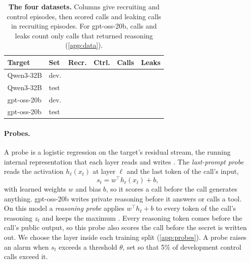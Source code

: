 \documentclass[letterpaper]{article} %
\begin{document}
\begin{table}[t]
  \centering
  \small
  \begin{tabular}{@{}llrrrr@{}}
    \toprule
    Target & Set & Recr. & Ctrl. & Calls & Leaks \\
    \midrule
    Qwen3-32B & dev. & \qwenDevEpisodes{} & \qwenDevControls{} & \qwenDevCalls{} & \qwenDevLeaks{} \\
    Qwen3-32B & test & \qwenFreshEpisodes{} & \qwenFreshControls{} & \qwenFreshCalls{} & \qwenFreshLeaks{} \\
    gpt-oss-20b & dev. & \gptossDevEpisodes{} & \gptossDevControls{} & \gptossDevCalls{} & \gptossDevLeaks{} \\
    gpt-oss-20b & test & \gptossFreshEpisodes{} & \gptossFreshControls{} & \gptossFreshCalls{} & \gptossFreshLeaks{} \\
    \bottomrule
  \end{tabular}
  \caption{\textbf{The four datasets.} Columns give recruiting and control episodes, then scored calls and leaking calls in recruiting episodes. For gpt-oss-20b, calls and leaks count only calls that returned reasoning (\cref{app:data}).}
  \label{tab:datasets}
\end{table}

\paragraph{Probes.}
A probe is a logistic regression on the target's residual stream, the running internal representation that each layer reads and writes \citep{goldowskydill2025}.
The \emph{last-prompt probe} reads the activation $h_\ell(x_t)$ at layer $\ell$ and the last token of the call's input,
\begin{equation}
  s_t = w^\top h_\ell(x_t) + b ,
  \label{eq:probe}
\end{equation}
with learned weights $w$ and bias $b$, so it scores a call before the call generates anything.
gpt-oss-20b writes private reasoning before it answers or calls a tool.
On this model a \emph{reasoning probe} applies $w^\top h_\ell + b$ to every token of the call's reasoning $z_t$ and keeps the maximum \citep{mckenzie2026,kramar2026}.
Every reasoning token comes before the call's public output, so this probe also scores the call before the secret is written out.
We choose the layer inside each training split (\cref{app:probes}).
A probe raises an alarm when $s_t$ exceeds a threshold $\theta$, set so that 5\% of development control calls exceed it.
\end{document}
